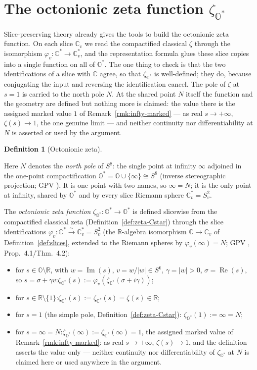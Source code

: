 \documentclass[11pt]{article}
\newcommand{\OO}{\mathbb{O}}
\newcommand{\CC}{\mathbb{C}}
\newcommand{\RR}{\mathbb{R}}
\newcommand{\Ostar}{\OO^{*}}
\newcommand{\Cstar}{\CC^{*}}
\newcommand{\zetaO}{\zeta_{\Ostar}}
\newcommand{\zetaC}{\zeta_{\Cstar}}
\DeclareMathOperator{\re}{Re}
\DeclareMathOperator{\im}{Im}
\providecommand{\lean}[1]{}
\providecommand{\uses}[1]{}
\theoremstyle{plain}
\theoremstyle{definition}
\newtheorem{definition}[theorem]{Definition}
\theoremstyle{remark}
\begin{document}
\section{The octonionic zeta function \texorpdfstring{$\zetaO$}{zeta\_O}}

Slice-preserving theory already gives the tools to build the octonionic zeta function. On each slice
$\CC_v$ we read the compactified classical $\zeta$ through the isomorphism
$\varphi_v:\Cstar\to\CC_v^{*}$, and the representation formula glues these slice copies into a single
function on all of $\Ostar$. The one thing to check is that the two identifications of a slice with
$\CC$ agree, so that $\zetaO$ is well-defined; they do, because conjugating the input and reversing
the identification cancel. The pole of $\zeta$ at $s=1$ is carried to the north pole $N$.
At the shared point $N$ itself the function and the geometry are defined but nothing more
is claimed: the value there is the assigned marked value $1$ of
Remark~\ref{rmk:infty-marked} --- as real $s\to+\infty$, $\zeta(s)\to1$, the one genuine
limit --- and neither continuity nor differentiability at $N$ is asserted or used by the
argument.

\begin{definition}[Octonionic zeta]\label{def:zeta_O}
\lean{zetaO, zetaO_infty, zetaO_one, zetaO_sliceEmbed,
zetaO_sliceEmbed_of_im_neg, zetaO_ofReal}
\uses{def:zeta-Cstar, def:slices, thm:extension}
Here $N$ denotes the \emph{north pole} of $S^8$: the single point at infinity $\infty$
adjoined in the one-point compactification $\Ostar=\OO\cup\{\infty\}\cong S^8$ (inverse
stereographic projection; GPV \cite{VS}). It is one point with two names, so $\infty=N$;
it is the only point at infinity, shared by $\Ostar$ and by every slice Riemann sphere
$\CC_v^{*}=S^2_v$.

The \emph{octonionic zeta function} $\zetaO:\Ostar\to\Ostar$ is defined slicewise from the
compactified classical zeta (Definition~\ref{def:zeta-Cstar}) through the slice
identifications $\varphi_v:\Cstar\xrightarrow{\sim}\CC_v^{*}=S^2_v$ (the $\RR$-algebra
isomorphism $\CC\to\CC_v$ of Definition~\ref{def:slices}, extended to the Riemann spheres
by $\varphi_v(\infty)=N$; GPV \cite{VS}, Prop.~4.1/Thm.~4.2):
\begin{itemize}[leftmargin=2.2em]
\item[(i)] for $s\in\OO\setminus\RR$, with $w=\im(s)$, $v=w/|w|\in S^6$, $\gamma=|w|>0$,
  $\sigma=\re(s)$, so $s=\sigma+\gamma v$:\quad $\zetaO(s):=\varphi_v(\zetaC(\sigma+i\gamma))$;
\item[(ii)] for $s\in\RR\setminus\{1\}$:\quad $\zetaO(s):=\zetaC(s)=\zeta(s)\in\RR$;
\item[(iii)] for $s=1$ (the simple pole, Definition~\ref{def:zeta-Cstar}):\quad
  $\zetaO(1):=\infty=N$;
\item[(iv)] for $s=\infty=N$:\quad $\zetaO(\infty):=\zetaC(\infty)=1$, the assigned
  marked value of Remark~\ref{rmk:infty-marked}: as real $s\to+\infty$,
  $\zeta(s)\to1$, and the definition asserts the value only --- neither continuity
  nor differentiability of $\zetaO$ at $N$ is claimed here or used anywhere in the
  argument.
\end{itemize}
\end{definition}
\end{document}
